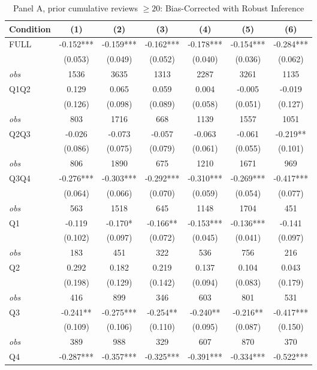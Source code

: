 \begin{table}[!htbp]
\centering
\caption{Panel A, prior cumulative reviews $\geq20$: Bias-Corrected with Robust Inference}
\begin{tabular}{lcccccc}
\toprule
Condition & (1) & (2) & (3) & (4) & (5) & (6) \\
\midrule
FULL & -0.152*** & -0.159*** & -0.162*** & -0.178*** & -0.154*** & -0.284*** \\
 & (0.053) & (0.049) & (0.052) & (0.040) & (0.036) & (0.062) \\
\textit{obs} & 1536 & 3635 & 1313 & 2287 & 3261 & 1135 \\
Q1Q2 & 0.129 & 0.065 & 0.059 & 0.004 & -0.005 & -0.019 \\
 & (0.126) & (0.098) & (0.089) & (0.058) & (0.051) & (0.127) \\
\textit{obs} & 803 & 1716 & 668 & 1139 & 1557 & 1051 \\
Q2Q3 & -0.026 & -0.073 & -0.057 & -0.063 & -0.061 & -0.219** \\
 & (0.086) & (0.075) & (0.079) & (0.061) & (0.055) & (0.101) \\
\textit{obs} & 806 & 1890 & 675 & 1210 & 1671 & 969 \\
Q3Q4 & -0.276*** & -0.303*** & -0.292*** & -0.310*** & -0.269*** & -0.417*** \\
 & (0.064) & (0.066) & (0.070) & (0.059) & (0.054) & (0.077) \\
\textit{obs} & 563 & 1518 & 645 & 1148 & 1704 & 451 \\
Q1 & -0.119 & -0.170* & -0.166** & -0.153*** & -0.136*** & -0.141 \\
 & (0.102) & (0.097) & (0.072) & (0.045) & (0.041) & (0.097) \\
\textit{obs} & 183 & 451 & 322 & 536 & 756 & 216 \\
Q2 & 0.292 & 0.182 & 0.219 & 0.137 & 0.104 & 0.043 \\
 & (0.198) & (0.129) & (0.142) & (0.094) & (0.083) & (0.179) \\
\textit{obs} & 416 & 899 & 346 & 603 & 801 & 531 \\
Q3 & -0.241** & -0.275*** & -0.254** & -0.240** & -0.216** & -0.417*** \\
 & (0.109) & (0.106) & (0.110) & (0.095) & (0.087) & (0.150) \\
\textit{obs} & 389 & 988 & 329 & 607 & 870 & 370 \\
Q4 & -0.287*** & -0.357*** & -0.325*** & -0.391*** & -0.334*** & -0.522*** \\

\end{tabular}
\end{table}
